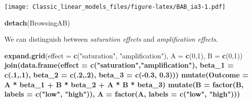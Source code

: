 \documentclass[]{svmono}
\newenvironment{Shaded}{\begin{snugshade}}{\end{snugshade}}
\newcommand{\KeywordTok}[1]{\textcolor[rgb]{0.13,0.29,0.53}{\textbf{#1}}}
\newcommand{\DataTypeTok}[1]{\textcolor[rgb]{0.13,0.29,0.53}{#1}}
\newcommand{\DecValTok}[1]{\textcolor[rgb]{0.00,0.00,0.81}{#1}}
\newcommand{\FloatTok}[1]{\textcolor[rgb]{0.00,0.00,0.81}{#1}}
\newcommand{\StringTok}[1]{\textcolor[rgb]{0.31,0.60,0.02}{#1}}
\newcommand{\OperatorTok}[1]{\textcolor[rgb]{0.81,0.36,0.00}{\textbf{#1}}}
\newcommand{\NormalTok}[1]{#1}
\theoremstyle{definition}
\theoremstyle{definition}
\theoremstyle{definition}
\theoremstyle{remark}
\begin{document}
\texttt{[image: Classic\_linear\_models\_files/figure-latex/BAB\_ia3-1.pdf]}

\begin{Shaded}
\begin{Highlighting}[]
\KeywordTok{detach}\NormalTok{(BrowsingAB)}
\end{Highlighting}
\end{Shaded}

We can distinguish between \emph{saturation effects} and
\emph{amplification effects}.

\begin{Shaded}
\begin{Highlighting}[]
    \KeywordTok{expand.grid}\NormalTok{(}\DataTypeTok{effect =} \KeywordTok{c}\NormalTok{(}\StringTok{"saturation"}\NormalTok{, }\StringTok{"amplification"}\NormalTok{), }
                            \DataTypeTok{A =} \KeywordTok{c}\NormalTok{(}\DecValTok{0}\NormalTok{,}\DecValTok{1}\NormalTok{),}
                            \DataTypeTok{B =} \KeywordTok{c}\NormalTok{(}\DecValTok{0}\NormalTok{,}\DecValTok{1}\NormalTok{)) }\OperatorTok{%
\StringTok{        }\KeywordTok{join}\NormalTok{(}\KeywordTok{data.frame}\NormalTok{(}\DataTypeTok{effect =} \KeywordTok{c}\NormalTok{(}\StringTok{"saturation"}\NormalTok{,}\StringTok{"amplification"}\NormalTok{),}
                                        \DataTypeTok{beta_1 =} \KeywordTok{c}\NormalTok{(.}\DecValTok{1}\NormalTok{,.}\DecValTok{1}\NormalTok{),}
                                        \DataTypeTok{beta_2 =} \KeywordTok{c}\NormalTok{(.}\DecValTok{2}\NormalTok{,.}\DecValTok{2}\NormalTok{),}
                                        \DataTypeTok{beta_3 =} \KeywordTok{c}\NormalTok{(}\OperatorTok{-}\FloatTok{0.3}\NormalTok{, }\FloatTok{0.3}\NormalTok{)))  }\OperatorTok{%
\StringTok{        }\KeywordTok{mutate}\NormalTok{(}\DataTypeTok{Outcome =}\NormalTok{ A }\OperatorTok{*}\StringTok{ }\NormalTok{beta_}\DecValTok{1} \OperatorTok{+}\StringTok{ }\NormalTok{B }\OperatorTok{*}\StringTok{ }\NormalTok{beta_}\DecValTok{2} \OperatorTok{+}\StringTok{ }\NormalTok{A }\OperatorTok{*}\StringTok{ }\NormalTok{B }\OperatorTok{*}\StringTok{ }\NormalTok{beta_}\DecValTok{3}\NormalTok{) }\OperatorTok{%
\StringTok{        }\KeywordTok{mutate}\NormalTok{(}\DataTypeTok{B =} \KeywordTok{factor}\NormalTok{(B, }\DataTypeTok{labels =} \KeywordTok{c}\NormalTok{(}\StringTok{"low"}\NormalTok{, }\StringTok{"high"}\NormalTok{)),}
                     \DataTypeTok{A =} \KeywordTok{factor}\NormalTok{(A, }\DataTypeTok{labels =} \KeywordTok{c}\NormalTok{(}\StringTok{"low"}\NormalTok{, }\StringTok{"high"}\NormalTok{))) }\OperatorTok{%
}}}}
\end{Highlighting}
\end{Shaded}
\end{document}
